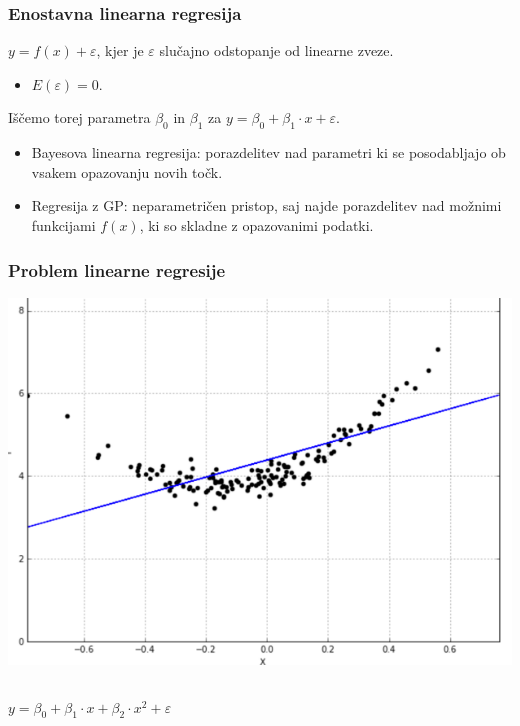 \documentclass{beamer}
\begin{document}

\begin{frame}\frametitle{Enostavna linearna regresija}

$ y= f(x) + \varepsilon $, kjer je $\varepsilon$ slučajno odstopanje od linearne zveze.
\begin{itemize}
\item  $ E(\varepsilon) = 0. $
\end{itemize}
Iščemo torej parametra $ \beta_0 $ in $\beta_1$ za $ y= \beta_0 + \beta_1 \cdot x + \varepsilon$.
\begin{itemize}
\item Bayesova linearna regresija: porazdelitev nad parametri ki se posodabljajo ob vsakem opazovanju novih točk.
\item Regresija z GP: \alert{neparametričen} pristop, saj najde porazdelitev nad možnimi funkcijami $f(x)$, ki so skladne z opazovanimi podatki.
\end{itemize}


\end{frame}
\begin{frame}
\frametitle{Problem linearne regresije}

\includegraphics[scale=0.5]{problem} \pause

\begin{columns}
\begin{column}{7cm}

 $ y= \beta_0 + \beta_1 \cdot x + \beta_2 \cdot x^2 + \varepsilon$
\end{column}
\end{columns}
\end{frame}
\end{document}
